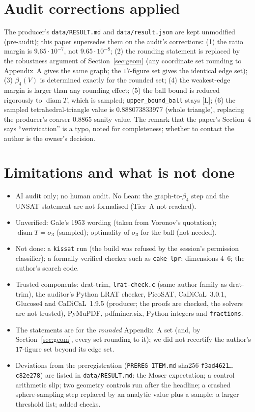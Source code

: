 \documentclass[10pt]{article}
\newcommand{\tier}[1]{\textsf{[#1]}}
\newcommand{\tL}{\tier{L}}
\newcommand{\bb}{\beta}
\begin{document}
\section{Audit corrections applied}\label{sec:corr}
The producer's \texttt{data/RESULT.md} and \texttt{data/result.json} are kept unmodified (pre-audit); this paper supersedes them on the audit's corrections: (1) the ratio margin is $9.65\cdot10^{-7}$, not $9.65\cdot10^{-8}$; (2) the rounding statement is replaced by the robustness argument of Section~\ref{sec:geom} (any coordinate set rounding to Appendix~A gives the same graph; the $17$-figure set gives the identical edge set); (3) $\bb_4(V)$ is determined exactly for the rounded set; (4) the weakest-edge margin is larger than any rounding effect; (5) the ball bound is reduced rigorously to $\operatorname{diam}T$, which is sampled; \texttt{upper\_bound\_ball} stays \tL{}; (6) the sampled tetrahedral-triangle value is $0.888073833977$ (whole triangle), replacing the producer's coarser $0.8865$ sanity value. The remark that the paper's Section~4 says ``verivication'' is a typo, noted for completeness; whether to contact the author is the owner's decision.

\section{Limitations and what is not done}\label{sec:lim}
\begin{itemize}\itemsep=1pt
\item AI audit only; no human audit. No Lean: the graph-to-$\bb_4$ step and the UNSAT statement are not formalised (Tier~A not reached).
\item Unverified: Gale's 1953 wording (taken from Voronov's quotation); $\operatorname{diam}T=\sigma_3$ (sampled); optimality of $\sigma_3$ for the ball (not needed).
\item Not done: a \texttt{kissat} run (the build was refused by the session's permission classifier); a formally verified checker such as \texttt{cake\_lpr}; dimensions $4$--$6$; the author's search code.
\item Trusted components: drat-trim, \texttt{lrat-check.c} (same author family as drat-trim), the auditor's Python LRAT checker, PicoSAT, CaDiCaL~3.0.1, Glucose4 and CaDiCaL~1.9.5 (producer; the proofs are checked, the solvers are not trusted), PyMuPDF, pdfminer.six, Python integers and \texttt{fractions}.
\item The statements are for the \emph{rounded} Appendix~A set (and, by Section~\ref{sec:geom}, every set rounding to it); we did not recertify the author's $17$-figure set beyond its edge set.
\item Deviations from the preregistration (\texttt{PREREG\_ITEM.md} sha256 \texttt{f3ad4621\dots c82e278}) are listed in \texttt{data/RESULT.md}: the Moser expectation; a control arithmetic slip; two geometry controls run after the headline; a crashed sphere-sampling step replaced by an analytic value plus a sample; a larger threshold list; added checks.
\end{itemize}
\end{document}
